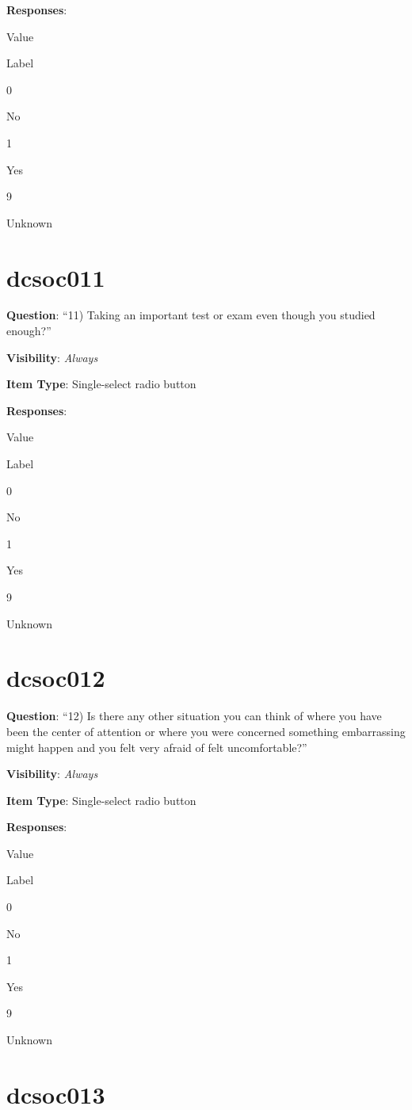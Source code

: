 \documentclass[]{book}
\begin{document}
\textbf{Responses}:

Value

Label

0

No

1

Yes

9

Unknown

\hypertarget{dcsoc011}{%
\section{dcsoc011}\label{dcsoc011}}

\textbf{Question}: ``11) Taking an important test or exam even though you studied enough?''

\textbf{Visibility}: \emph{Always}

\textbf{Item Type}: Single-select radio button

\textbf{Responses}:

Value

Label

0

No

1

Yes

9

Unknown

\hypertarget{dcsoc012}{%
\section{dcsoc012}\label{dcsoc012}}

\textbf{Question}: ``12) Is there any other situation you can think of where you have been the center of attention or where you were concerned something embarrassing might happen and you felt very afraid of felt uncomfortable?''

\textbf{Visibility}: \emph{Always}

\textbf{Item Type}: Single-select radio button

\textbf{Responses}:

Value

Label

0

No

1

Yes

9

Unknown

\hypertarget{dcsoc013}{%
\section{dcsoc013}\label{dcsoc013}}
\end{document}
